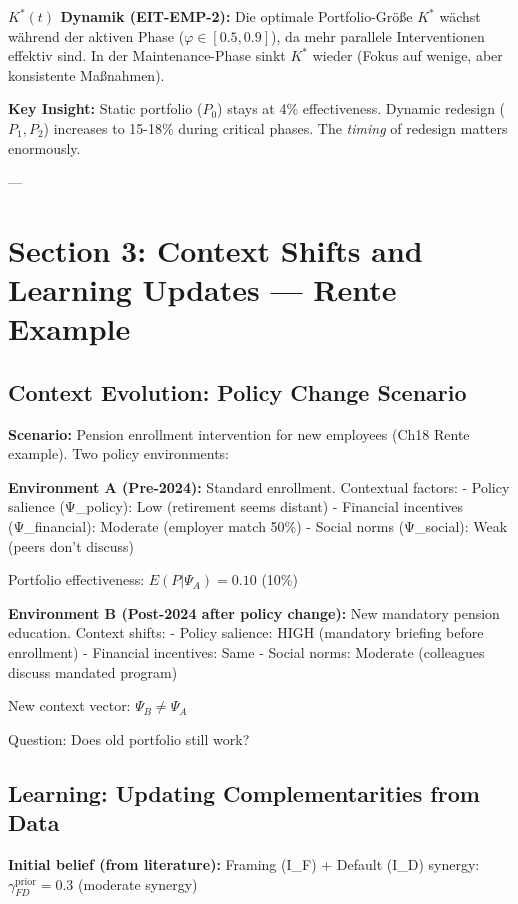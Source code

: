 \textbf{$K^*(t)$ Dynamik (EIT-EMP-2):} Die optimale Portfolio-Größe $K^*$ wächst während der aktiven Phase ($\varphi \in [0.5, 0.9]$), da mehr parallele Interventionen effektiv sind. In der Maintenance-Phase sinkt $K^*$ wieder (Fokus auf wenige, aber konsistente Maßnahmen).

\textbf{Key Insight:} Static portfolio ($P_0$) stays at 4\% effectiveness. Dynamic redesign ($P_1, P_2$) increases to 15-18\% during critical phases. The \textit{timing} of redesign matters enormously.

---

\section{Section 3: Context Shifts and Learning Updates — Rente Example}
\label{sec:21-context-learning}

\subsection{Context Evolution: Policy Change Scenario}

\textbf{Scenario:} Pension enrollment intervention for new employees (Ch18 Rente example). Two policy environments:

\textbf{Environment A (Pre-2024):} Standard enrollment. Contextual factors:
- Policy salience (Ψ_policy): Low (retirement seems distant)
- Financial incentives (Ψ_financial): Moderate (employer match 50\%)
- Social norms (Ψ_social): Weak (peers don't discuss)

Portfolio effectiveness: $E(P | \Psi_A) = 0.10$ (10\%)

\textbf{Environment B (Post-2024 after policy change):} New mandatory pension education. Context shifts:
- Policy salience: HIGH (mandatory briefing before enrollment)
- Financial incentives: Same
- Social norms: Moderate (colleagues discuss mandated program)

New context vector: $\Psi_B \neq \Psi_A$

Question: Does old portfolio still work?

\subsection{Learning: Updating Complementarities from Data}

\textbf{Initial belief (from literature):} Framing (I_F) + Default (I_D) synergy: $\gamma_{FD}^{\text{prior}} = 0.3$ (moderate synergy)

